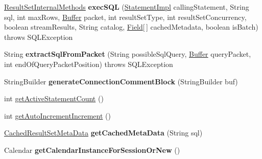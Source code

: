 \begin{DoxyCompactItemize}
\mbox{\hyperlink{interfacecom_1_1mysql_1_1jdbc_1_1_result_set_internal_methods}{Result\+Set\+Internal\+Methods}} {\bfseries exec\+S\+QL} (\mbox{\hyperlink{classcom_1_1mysql_1_1jdbc_1_1_statement_impl}{Statement\+Impl}} calling\+Statement, String sql, int max\+Rows, \mbox{\hyperlink{classcom_1_1mysql_1_1jdbc_1_1_buffer}{Buffer}} packet, int result\+Set\+Type, int result\+Set\+Concurrency, boolean stream\+Results, String catalog, \mbox{\hyperlink{classcom_1_1mysql_1_1jdbc_1_1_field}{Field}}\mbox{[}$\,$\mbox{]} cached\+Metadata, boolean is\+Batch)  throws S\+Q\+L\+Exception
\item 
\mbox{\label{interfacecom_1_1mysql_1_1jdbc_1_1_my_s_q_l_connection_a1ac764ce0fcefea678c06e4754020669}} 
String {\bfseries extract\+Sql\+From\+Packet} (String possible\+Sql\+Query, \mbox{\hyperlink{classcom_1_1mysql_1_1jdbc_1_1_buffer}{Buffer}} query\+Packet, int end\+Of\+Query\+Packet\+Position)  throws S\+Q\+L\+Exception
\item 
\mbox{\label{interfacecom_1_1mysql_1_1jdbc_1_1_my_s_q_l_connection_a9c080f1dfc79b26f216ab9658eace7ae}} 
String\+Builder {\bfseries generate\+Connection\+Comment\+Block} (String\+Builder buf)
\item 
int \mbox{\hyperlink{interfacecom_1_1mysql_1_1jdbc_1_1_my_s_q_l_connection_aa42802b4debbacd9680e2ca0b70fd53d}{get\+Active\+Statement\+Count}} ()
\item 
int \mbox{\hyperlink{interfacecom_1_1mysql_1_1jdbc_1_1_my_s_q_l_connection_acb6ababcad41a91c6a44d300d09acff9}{get\+Auto\+Increment\+Increment}} ()
\item 
\mbox{\label{interfacecom_1_1mysql_1_1jdbc_1_1_my_s_q_l_connection_ad1d2139bf1722c53fad85f8f0a899c75}} 
\mbox{\hyperlink{classcom_1_1mysql_1_1jdbc_1_1_cached_result_set_meta_data}{Cached\+Result\+Set\+Meta\+Data}} {\bfseries get\+Cached\+Meta\+Data} (String sql)
\item 
\mbox{\label{interfacecom_1_1mysql_1_1jdbc_1_1_my_s_q_l_connection_a50666cfad63576361d1d291309782cd1}} 
Calendar {\bfseries get\+Calendar\+Instance\+For\+Session\+Or\+New} ()
\item 
\mbox{\label{interfacecom_1_1mysql_1_1jdbc_1_1_my_s_q_l_connection_a039bf30fc0d3b5d481b9936e524b4f2c}} 

\end{DoxyCompactItemize}
